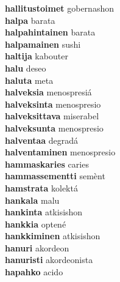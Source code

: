 \textbf{hallitustoimet } gobernashon \\
\textbf{halpa } barata \\
\textbf{halpahintainen } barata \\
\textbf{halpamainen } sushi \\
\textbf{haltija } kabouter \\
\textbf{halu } deseo \\
\textbf{haluta } meta \\
\textbf{halveksia } menospresiá \\
\textbf{halveksinta } menospresio \\
\textbf{halveksittava } miserabel \\
\textbf{halveksunta } menospresio \\
\textbf{halventaa } degradá \\
\textbf{halventaminen } menospresio \\
\textbf{hammaskaries } caries \\
\textbf{hammassementti } semènt \\
\textbf{hamstrata } kolektá \\
\textbf{hankala } malu \\
\textbf{hankinta } atkisishon \\
\textbf{hankkia } optené \\
\textbf{hankkiminen } atkisishon \\
\textbf{hanuri } akordeon \\
\textbf{hanuristi } akordeonista \\
\textbf{hapahko } acido \\
